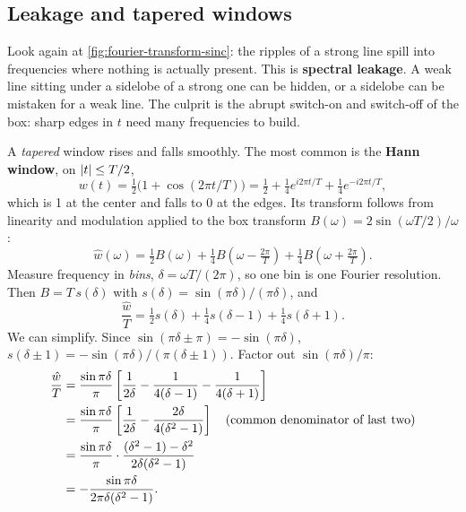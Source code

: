 \subsection{Leakage and tapered windows}

Look again at \cref{fig:fourier-transform-sinc}: the ripples of a strong line spill into frequencies where nothing is actually present. This is \textbf{spectral leakage}. A weak line sitting under a sidelobe of a strong one can be hidden, or a sidelobe can be mistaken for a weak line. The culprit is the abrupt switch-on and switch-off of the box: sharp edges in $t$ need many frequencies to build.

A \emph{tapered} window rises and falls smoothly. The most common is the \textbf{Hann window}, on $\left\lvert t\right\rvert\le T/2$,
\begin{equation}
w(t)=\tfrac12\bigl(1+\cos(2\pi t/T)\bigr)=\tfrac12+\tfrac14e^{i2\pi t/T}+\tfrac14e^{-i2\pi t/T},
\end{equation}
which is 1 at the center and falls to 0 at the edges. Its transform follows from linearity and modulation applied to the box transform $B(\omega)=2\sin(\omega T/2)/\omega$:
\begin{equation}
\hat w(\omega)=\tfrac12B(\omega)+\tfrac14B\!\left(\omega-\tfrac{2\pi}T\right)+\tfrac14B\!\left(\omega+\tfrac{2\pi}T\right).
\end{equation}
Measure frequency in \emph{bins}, $\delta=\omega T/(2\pi)$, so one bin is one Fourier resolution. Then $B=T\,s(\delta)$ with $s(\delta)=\sin(\pi\delta)/(\pi\delta)$, and
\begin{equation}
\frac{\hat w}{T}=\tfrac12s(\delta)+\tfrac14s(\delta-1)+\tfrac14s(\delta+1).
\label{eq:fourier-transform-hann3}
\end{equation}
We can simplify. Since $\sin(\pi\delta\pm\pi)=-\sin(\pi\delta)$, $s(\delta\pm1)=-\sin(\pi\delta)/(\pi(\delta\pm1))$. Factor out $\sin(\pi\delta)/\pi$:
\begin{align}
\frac{\hat w}{T}&=\frac{\sin\pi\delta}{\pi}\left[\frac{1}{2\delta}-\frac{1}{4(\delta-1)}-\frac{1}{4(\delta+1)}\right]\notag\\
&=\frac{\sin\pi\delta}{\pi}\left[\frac{1}{2\delta}-\frac{2\delta}{4(\delta^2-1)}\right]\quad\text{(common denominator of last two)}\notag\\
&=\frac{\sin\pi\delta}{\pi}\cdot\frac{(\delta^2-1)-\delta^2}{2\delta(\delta^2-1)}\notag\\
&=-\frac{\sin\pi\delta}{2\pi\delta(\delta^2-1)}.
\label{eq:fourier-transform-hann}
\end{align}
